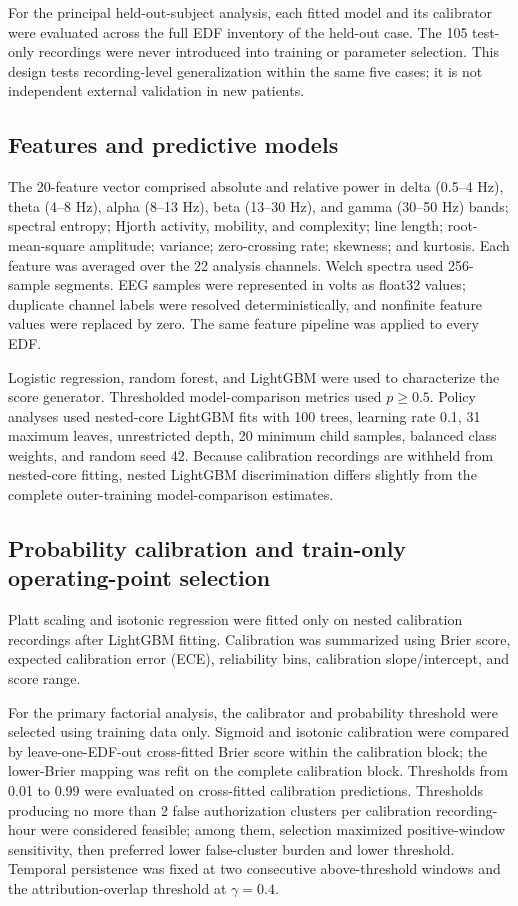 \documentclass[11pt,a4paper]{article}
\begin{document}
For the principal held-out-subject analysis, each fitted model and its calibrator were evaluated across the full EDF inventory of the held-out case. The 105 test-only recordings were never introduced into training or parameter selection. This design tests recording-level generalization within the same five cases; it is not independent external validation in new patients.

\subsection{Features and predictive models}
\label{sec:features}
The 20-feature vector comprised absolute and relative power in delta (0.5--4 Hz), theta (4--8 Hz), alpha (8--13 Hz), beta (13--30 Hz), and gamma (30--50 Hz) bands; spectral entropy; Hjorth activity, mobility, and complexity; line length; root-mean-square amplitude; variance; zero-crossing rate; skewness; and kurtosis. Each feature was averaged over the 22 analysis channels. Welch spectra used 256-sample segments. EEG samples were represented in volts as float32 values; duplicate channel labels were resolved deterministically, and nonfinite feature values were replaced by zero. The same feature pipeline was applied to every EDF.

Logistic regression, random forest, and LightGBM were used to characterize the score generator. Thresholded model-comparison metrics used $p\geq0.5$. Policy analyses used nested-core LightGBM fits with 100 trees, learning rate 0.1, 31 maximum leaves, unrestricted depth, 20 minimum child samples, balanced class weights, and random seed 42. Because calibration recordings are withheld from nested-core fitting, nested LightGBM discrimination differs slightly from the complete outer-training model-comparison estimates.

\subsection{Probability calibration and train-only operating-point selection}
\label{sec:calibration_selection}
Platt scaling and isotonic regression were fitted only on nested calibration recordings after LightGBM fitting. Calibration was summarized using Brier score, expected calibration error (ECE), reliability bins, calibration slope/intercept, and score range.

For the primary factorial analysis, the calibrator and probability threshold were selected using training data only. Sigmoid and isotonic calibration were compared by leave-one-EDF-out cross-fitted Brier score within the calibration block; the lower-Brier mapping was refit on the complete calibration block. Thresholds from 0.01 to 0.99 were evaluated on cross-fitted calibration predictions. Thresholds producing no more than 2 false authorization clusters per calibration recording-hour were considered feasible; among them, selection maximized positive-window sensitivity, then preferred lower false-cluster burden and lower threshold. Temporal persistence was fixed at two consecutive above-threshold windows and the attribution-overlap threshold at $\gamma=0.4$.
\end{document}
